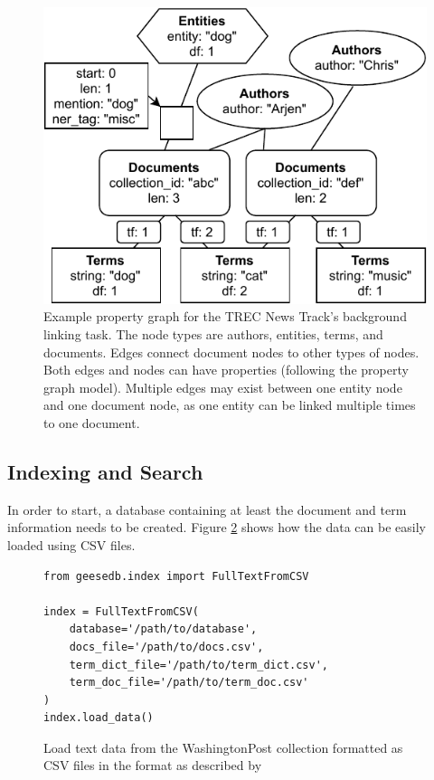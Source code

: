 \begin{figure}
	\centering
	\includegraphics[width=\linewidth]{./imgs/example_full_graph.pdf}
	\caption{Example property graph for the TREC News Track's background linking task. The node types are authors, entities, terms, and documents. Edges connect document nodes to other types of nodes. Both edges and nodes can have properties (following the property graph model). Multiple edges may exist between one entity node and one document node, as one entity can be linked multiple times to one document.}
	\label{fig:geesedb-graph}
\end{figure}

\subsection{Indexing and Search}
In order to start, a database containing at least the document and term information needs to be created. Figure \ref{fig:load_text_data} shows how the data can be easily loaded using CSV files.
\begin{figure}
	\begin{verbatim}
from geesedb.index import FullTextFromCSV

index = FullTextFromCSV(
    database='/path/to/database',
    docs_file='/path/to/docs.csv',
    term_dict_file='/path/to/term_dict.csv',
    term_doc_file='/path/to/term_doc.csv'
)
index.load_data()
	\end{verbatim}
	\caption{Load text data from the WashingtonPost collection formatted as CSV files in the format as described by~\citet{OldDog}}
	\label{fig:load_text_data}
\end{figure}

